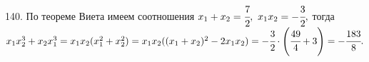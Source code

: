 140. По теореме Виета имеем соотношения $x_1+x_2=\cfrac{7}{2},\ x_1x_2=-\cfrac{3}{2},$ тогда $x_1x_2^3+x_2x_1^3=x_1x_2(x_1^2+x_2^2)=
x_1x_2((x_1+x_2)^2-2x_1x_2)=-\cfrac{3}{2}\cdot\left(\cfrac{49}{4}+3\right)=-\cfrac{183}{8}.$\\
